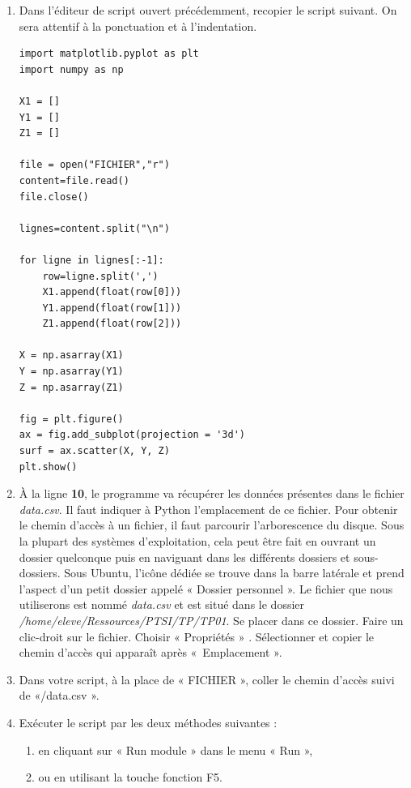 \begin{exercice}

\begin{enumerate}
\item Dans l'éditeur de script ouvert précédemment, recopier le script suivant. On sera attentif \` a la ponctuation et \` a l'indentation.

\begin{verbatim}
import matplotlib.pyplot as plt
import numpy as np

X1 = []
Y1 = []
Z1 = []

file = open("FICHIER","r")
content=file.read()
file.close()

lignes=content.split("\n")

for ligne in lignes[:-1]:
    row=ligne.split(',')
    X1.append(float(row[0]))
    Y1.append(float(row[1]))
    Z1.append(float(row[2]))

X = np.asarray(X1)
Y = np.asarray(Y1)
Z = np.asarray(Z1)

fig = plt.figure()
ax = fig.add_subplot(projection = '3d')
surf = ax.scatter(X, Y, Z)
plt.show()
\end{verbatim}

\item À la ligne \textbf{10}, le programme va r\' ecup\' erer les donn\' ees pr\' esentes dans le fichier \textit{data.csv}. Il faut indiquer \` a Python l'emplacement de ce fichier. Pour obtenir le chemin d'acc\` es \` a un fichier, il faut parcourir l'arborescence du disque. Sous la plupart des syst\` emes d'exploitation, cela peut \^ etre fait en ouvrant un dossier quelconque puis en naviguant dans les diff\' erents dossiers et sous-dossiers. Sous Ubuntu, l'ic\^ one d\' edi\' ee se trouve dans la barre lat\' erale et prend l'aspect d'un petit dossier appel\' e « Dossier personnel ». Le fichier que nous utiliserons est nomm\' e \textit{data.csv} et est situ\' e dans le dossier \textit{/home/eleve/Ressources/PTSI/TP/TP01}. Se placer dans ce dossier. Faire un clic-droit sur le fichier. Choisir « Propri\' et\' es » . S\' electionner et copier le chemin d'acc\` es qui appara\^ it apr\` es «~Emplacement ».
\item Dans votre script, \` a la place de « FICHIER », coller le chemin d'acc\` es suivi de «/data.csv ».
\item Ex\' ecuter le script par les deux m\' ethodes suivantes :

\begin{enumerate}
\item en cliquant sur « Run module » dans le menu « Run », 
\item ou en utilisant la touche fonction F5.
\end{enumerate}
\end{enumerate}
\end{exercice}

